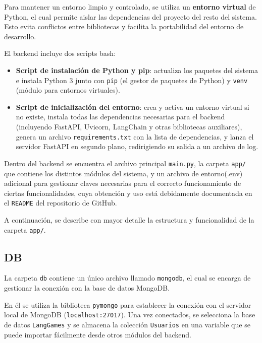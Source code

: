 Para mantener un entorno limpio y controlado, se utiliza un \textbf{entorno virtual} de Python, el cual permite aislar las dependencias del proyecto del resto del sistema. Esto evita conflictos entre bibliotecas y facilita la portabilidad del entorno de desarrollo.

El backend incluye dos scripts bash:

\begin{itemize}
	\item \textbf{Script de instalación de Python y pip}: actualiza los paquetes del sistema e instala Python 3 junto con \texttt{pip} (el gestor de paquetes de Python) y \texttt{venv} (módulo para entornos virtuales).
	
	\item \textbf{Script de inicialización del entorno}: crea y activa un entorno virtual si no existe, instala todas las dependencias necesarias para el backend (incluyendo FastAPI, Uvicorn, LangChain y otras bibliotecas auxiliares), genera un archivo \texttt{requirements.txt} con la lista de dependencias, y lanza el servidor FastAPI en segundo plano, redirigiendo su salida a un archivo de log.
\end{itemize}

Dentro del backend se encuentra el archivo principal \texttt{main.py}, la carpeta \texttt{app/} que contiene los distintos módulos del sistema, y un archivo de entorno(.env) adicional para gestionar claves necesarias para el correcto funcionamiento de ciertas funcionalidades, cuya obtención y uso está debidamente documentada en el \texttt{README} del repositorio de GitHub.

A continuación, se describe con mayor detalle la estructura y funcionalidad de la carpeta \texttt{app/}.


\subsection{DB}

La carpeta \texttt{db} contiene un único archivo llamado \texttt{mongodb}, el cual se encarga de gestionar la conexión con la base de datos MongoDB.

En él se utiliza la biblioteca \texttt{pymongo} para establecer la conexión con el servidor local de MongoDB (\texttt{localhost:27017}). Una vez conectados, se selecciona la base de datos \texttt{LangGames} y se almacena la colección \texttt{Usuarios} en una variable que se puede importar fácilmente desde otros módulos del backend.

